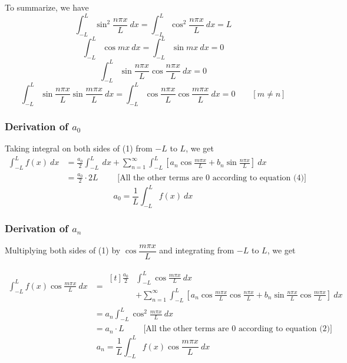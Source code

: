 \documentclass[12pt]{article}
\begin{document}
To summarize, we have
\begin{equation}
    \int_{-L}^{L} {\sin^2{\frac{n\pi x}{L}}} \: d{x} = \int_{-L}^{L} {\cos^2{\frac{n\pi x}{L}}} \: d{x} = L
\end{equation}
\begin{equation}
    \int_{-L}^{L} {\cos{mx}} \: d{x} = \int_{-L}^{L} {\sin{mx}} \: d{x} = 0
\end{equation}
\begin{equation}
    \int_{-L}^{L} {\sin{\frac{n\pi x}{L}}\cos{\frac{n\pi x}{L}}} \: d{x} = 0
\end{equation}
\begin{equation}
    \int_{-L}^{L} {\sin{\frac{n\pi x}{L}}\sin{\frac{m\pi x}{L}}} \: d{x} = \int_{-L}^{L} {\cos{\frac{n\pi x}{L}}\cos{\frac{m\pi x}{L}}} \: d{x} = 0 \qquad [m \neq n]
\end{equation}

\subsubsection{Derivation of $a_0$}
Taking integral on both sides of (1) from $-L$ to $L$, we get
\begin{align*}
    \int_{-L}^{L} {f(x)} \: d{x} &= \frac{a_0}{2} \int_{-L}^{L} {} \: d{x} + \sum_{n=1}^{\infty} \int_{-L}^{L} \left[ a_n \cos{\frac{m\pi x}{L}} + b_n \sin{\frac{n\pi x}{L}} \right] \: d{x} \\
    &= \frac{a_0}{2} \cdot 2L \qquad \text{ [All the other terms are $0$ according to equation (4)] }
\end{align*}
\[ \boxed{ a_0 = \frac{1}{L} \int_{-L}^{L} {f(x)} \: d{x} } \]

\subsubsection{Derivation of $a_n$}
Multiplying both sides of (1) by $\cos{\dfrac{m\pi x}{L}}$ and integrating from $-L$ to $L$, we get

\begin{align*}
    \int_{-L}^{L} {f(x) \cos{\frac{m\pi x}{L}}} \: d{x} &=
    \begin{aligned}[t]
        \frac{a_0}{2} &\int_{-L}^{L} {\cos{\frac{m\pi x}{L}}} \: d{x} \\
        & + \sum_{n=1}^{\infty} \int_{-L}^{L} \left[ a_n \cos{\frac{m\pi x}{L}} \cos{\frac{n\pi x}{L}} + b_n \sin{\frac{n\pi x}{L}} \cos{\frac{m\pi x}{L}} \right] \: d{x}
    \end{aligned} \\
    &= a_n \int_{-L}^{L} {\cos^2{\frac{m\pi x}{L}}} \: d{x} \\
    &= a_n \cdot L \qquad \text{ [All the other terms are $0$ according to equation (2)] }
\end{align*}
\[ \boxed{ a_n = \frac{1}{L} \int_{-L}^{L} {f(x) \cos{\frac{m\pi x}{L}}} \: d{x} } \]
\end{document}
